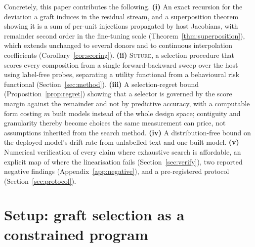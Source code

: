 \documentclass[10pt]{article}
\theoremstyle{plain}
\theoremstyle{definition}
\theoremstyle{remark}
\begin{document}
Concretely, this paper contributes the following.
\textbf{(i)} An exact recursion for the deviation a graft induces in the
residual stream, and a superposition theorem showing it is a sum of per-unit
injections propagated by host Jacobians, with remainder second order in the
fine-tuning scale (Theorem~\ref{thm:superposition}), which extends unchanged to
several donors and to continuous interpolation coefficients
(Corollary~\ref{cor:scoring}).
\textbf{(ii)} \textsc{Suture}, a selection procedure that scores every
composition from a single forward-backward sweep over the host using label-free
probes, separating a utility functional from a behavioural risk functional
(Section~\ref{sec:method}).
\textbf{(iii)} A selection-regret bound (Proposition~\ref{prop:regret}) showing
that a selector is governed by the score margin against the remainder and not by
predictive accuracy, with a computable form costing $m$ built models instead of
the whole design space; contiguity and granularity thereby become choices the
same measurement can price, not assumptions inherited from the search method.
\textbf{(iv)} A distribution-free bound on the deployed model's drift rate from
unlabelled text and one built model.
\textbf{(v)} Numerical verification of every claim where exhaustive search is
affordable, an explicit map of where the linearisation fails
(Section~\ref{sec:verify}), two reported negative findings
(Appendix~\ref{app:negative}), and a pre-registered protocol
(Section~\ref{sec:protocol}).

\begin{center}

\label{fig:teaser}
\end{center}

\section{Setup: graft selection as a constrained program}
\label{sec:setup}
\end{document}
